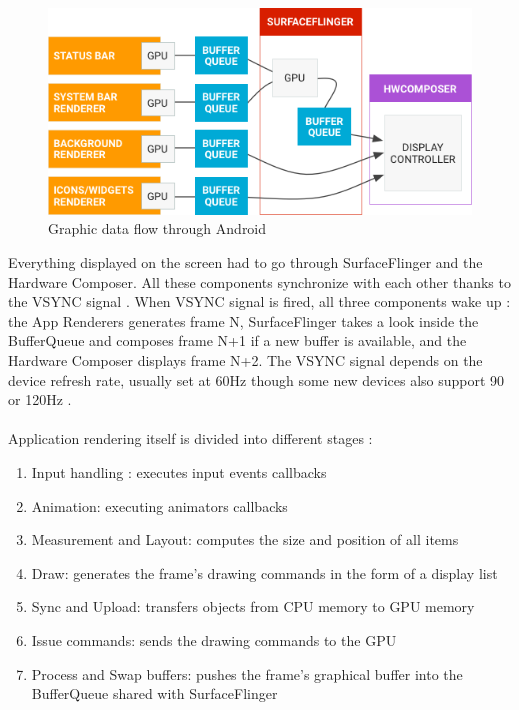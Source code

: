 \documentclass{kththesis}
\begin{document}
\begin{figure}[!ht]
    \includegraphics[width=13cm]{kththesis/Figures/android_data_flow.png}
    \caption[Graphic data flow through Android]{Graphic data flow through Android \footnotemark}
    \label{fig:my_label}
\end{figure}


Everything displayed on the screen had to go through SurfaceFlinger and the Hardware Composer.
All these components synchronize with each other thanks to the VSYNC signal \cite{vsync}. When VSYNC signal is fired, all three components wake up : the App Renderers generates frame N, SurfaceFlinger takes a look inside the BufferQueue and composes frame N+1 if a new buffer is available, and the Hardware Composer displays frame N+2. The VSYNC signal depends on the device refresh rate, usually set at 60Hz though some new devices also support 90 or 120Hz \cite{refresh_rate}.

\paragraph{}
Application rendering itself is divided into different stages \cite{app_rendering}:
\begin{enumerate}
    \item Input handling : executes input events callbacks
    \item Animation: executing animators callbacks
    \item Measurement and Layout: computes the size and position of all items
    \item Draw: generates the frame's drawing commands in the form of a display list
    \item Sync and Upload: transfers objects from CPU memory to GPU memory
    \item Issue commands: sends the drawing commands to the GPU
    \item Process and Swap buffers: pushes the frame's graphical buffer into the BufferQueue shared with SurfaceFlinger
\end{enumerate}
\end{document}
